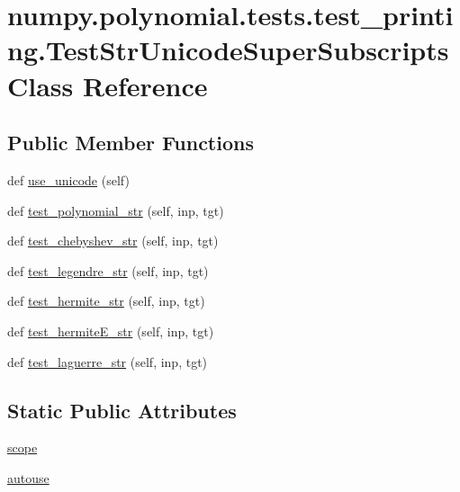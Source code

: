 \hypertarget{classnumpy_1_1polynomial_1_1tests_1_1test__printing_1_1TestStrUnicodeSuperSubscripts}{}\section{numpy.\+polynomial.\+tests.\+test\+\_\+printing.\+Test\+Str\+Unicode\+Super\+Subscripts Class Reference}
\label{classnumpy_1_1polynomial_1_1tests_1_1test__printing_1_1TestStrUnicodeSuperSubscripts}
\subsection*{Public Member Functions}
\begin{DoxyCompactItemize}
\item 
def \hyperlink{classnumpy_1_1polynomial_1_1tests_1_1test__printing_1_1TestStrUnicodeSuperSubscripts_adfdc361fcacfc770eb46f2610cdfe0d1}{use\+\_\+unicode} (self)
\item 
def \hyperlink{classnumpy_1_1polynomial_1_1tests_1_1test__printing_1_1TestStrUnicodeSuperSubscripts_a0a6cef8d9dbc6d021daae2d6e424e41c}{test\+\_\+polynomial\+\_\+str} (self, inp, tgt)
\item 
def \hyperlink{classnumpy_1_1polynomial_1_1tests_1_1test__printing_1_1TestStrUnicodeSuperSubscripts_ad68dc1969dbf3c715ce1b33768632cb6}{test\+\_\+chebyshev\+\_\+str} (self, inp, tgt)
\item 
def \hyperlink{classnumpy_1_1polynomial_1_1tests_1_1test__printing_1_1TestStrUnicodeSuperSubscripts_a333482f7200af7b5f41b977ccbed1697}{test\+\_\+legendre\+\_\+str} (self, inp, tgt)
\item 
def \hyperlink{classnumpy_1_1polynomial_1_1tests_1_1test__printing_1_1TestStrUnicodeSuperSubscripts_a305deaccfeede49f619553d6bec21cde}{test\+\_\+hermite\+\_\+str} (self, inp, tgt)
\item 
def \hyperlink{classnumpy_1_1polynomial_1_1tests_1_1test__printing_1_1TestStrUnicodeSuperSubscripts_a6caf5701a29eb3fe19dbb87c1f836b15}{test\+\_\+hermite\+E\+\_\+str} (self, inp, tgt)
\item 
def \hyperlink{classnumpy_1_1polynomial_1_1tests_1_1test__printing_1_1TestStrUnicodeSuperSubscripts_a3dcfc2a96ce9f5e58da3bb4fe8f5b49e}{test\+\_\+laguerre\+\_\+str} (self, inp, tgt)
\end{DoxyCompactItemize}
\subsection*{Static Public Attributes}
\begin{DoxyCompactItemize}
\item 
\hyperlink{classnumpy_1_1polynomial_1_1tests_1_1test__printing_1_1TestStrUnicodeSuperSubscripts_aa590afaf1a923764dd6f049842318fbb}{scope}
\item 
\hyperlink{classnumpy_1_1polynomial_1_1tests_1_1test__printing_1_1TestStrUnicodeSuperSubscripts_a9728417e46e2573b7c46ccacfb40710b}{autouse}
\end{DoxyCompactItemize}



